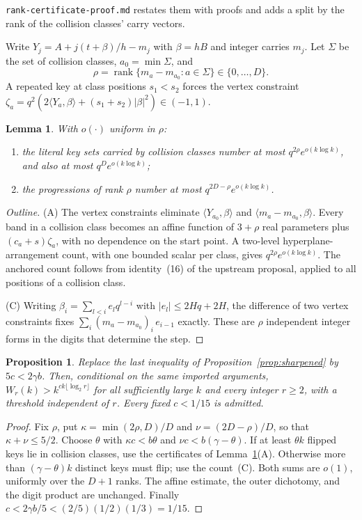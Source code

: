 \documentclass[11pt]{article}
\newtheorem{lemma}{Lemma}
\newtheorem{proposition}{Proposition}
\begin{document}
\noindent\texttt{rank-certificate-proof.md} restates them with proofs and
adds a split by the rank of the collision classes' carry vectors.

Write $Y_j=A+j(t+\beta)/h-m_j$ with $\beta=hB$ and integer carries $m_j$.
Let $\Sigma$ be the set of collision classes, $a_0=\min\Sigma$, and
\[
 \rho=\operatorname{rank}\{m_a-m_{a_0}:a\in\Sigma\}\in\{0,\dots,D\}.
\]
A repeated key at class positions $s_1<s_2$ forces the vertex constraint
$\zeta_a=q^2(2\langle Y_a,\beta\rangle+(s_1+s_2)|\beta|^2)\in(-1,1)$.
\begin{lemma}\label{lem:rank-counts}
With $o(\cdot)$ uniform in $\rho$:
\begin{enumerate}
 \item[(A)] the literal key sets carried by collision classes number at most
 $q^{2\rho}e^{o(k\log k)}$, and also at most $q^De^{o(k\log k)}$;
 \item[(C)] the progressions of rank $\rho$ number at most
 $q^{2D-\rho}e^{o(k\log k)}$.
\end{enumerate}
\end{lemma}
\begin{proof}[Outline]
(A) The vertex constraints eliminate $\langle Y_{a_0},\beta\rangle$ and
$\langle m_a-m_{a_0},\beta\rangle$. Every band in a collision class
becomes an affine function of $3+\rho$ real parameters plus
$(c_a+s)\zeta_a$, with no dependence on the start point. A two-level
hyperplane-arrangement count, with one bounded scalar per class, gives
$q^{2\rho}e^{o(k\log k)}$. The anchored count follows from identity~(16)
of the upstream proposal, applied to all positions of a collision class.

(C) Writing $\beta_i=\sum_{l<i}e_lq^{l-i}$ with $|e_l|\le2Hq+2H$, the
difference of two vertex constraints fixes
$\sum_i(m_a-m_{a_0})_i\,e_{i-1}$ exactly. These are $\rho$ independent
integer forms in the digits that determine the step.
\end{proof}
\begin{proposition}\label{prop:rank}
Replace the last inequality of Proposition~\ref{prop:sharpened} by
$5c<2\gamma b$. Then, conditional on the same imported arguments,
$W_r(k)>k^{ck\lfloor\log_2r\rfloor}$ for all sufficiently large $k$ and every
integer $r\ge2$, with a threshold independent of $r$. Every fixed $c<1/15$
is admitted.
\end{proposition}
\begin{proof}
Fix $\rho$, put $\kappa=\min(2\rho,D)/D$ and $\nu=(2D-\rho)/D$, so that
$\kappa+\nu\le5/2$. Choose $\theta$ with $\kappa c<b\theta$ and
$\nu c<b(\gamma-\theta)$. If at least $\theta k$ flipped keys lie in
collision classes, use the certificates of Lemma~\ref{lem:rank-counts}(A).
Otherwise more than $(\gamma-\theta)k$ distinct keys must flip; use the
count~(C). Both sums are $o(1)$, uniformly over the $D+1$ ranks. The
affine estimate, the outer dichotomy, and the digit product are unchanged.
Finally $c<2\gamma b/5<(2/5)(1/2)(1/3)=1/15$.
\end{proof}
\end{document}
